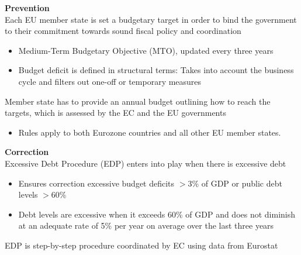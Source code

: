 \documentclass{beamer}
\begin{document}
\begin{frame}
  \textbf{Prevention}\\
    Each EU member state is set a budgetary target in order to bind the government to their commitment towards sound fiscal policy and coordination
    \begin{itemize}
      \item Medium-Term Budgetary Objective (MTO), updated every three years
      \item Budget deficit is defined in structural terms: Takes into account the business cycle and filters out one-off or temporary measures
    \end{itemize}
    Member state has to provide an annual budget outlining how to reach the targets, which is assessed by the EC and the EU governments
    \begin{itemize}
      \item Rules apply to both Eurozone countries and all other EU member states.  
    \end{itemize}
\end{frame}

\begin{frame}
  \textbf{Correction}\\
  Excessive Debt Procedure (EDP) enters into play when there is excessive debt 
  \begin{itemize}
    \item Ensures correction excessive budget deficits $>3$\% of GDP or public debt levels $>60$\%
    \item Debt levels are excessive when it exceeds 60\% of GDP and does not diminish at an adequate rate of 5\% per year on average over the last three years
  \end{itemize}
  \medskip
  EDP is step-by-step procedure coordinated by EC using data from Eurostat
\end{frame}
\end{document}
